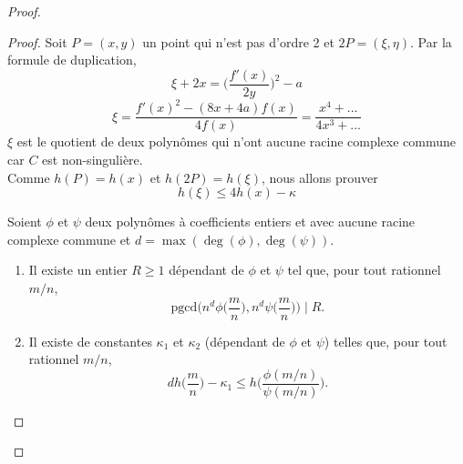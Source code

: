 \documentclass[a4paper]{article}
\begin{document}
\begin{proof}
\begin{proof}
Soit $P=(x,y)$ un point qui n'est pas d'ordre 2 et $2P=(\xi,\eta)$.
Par la formule de duplication, 
\begin{equation*}
\xi +2x=\Big( \frac{f'(x)}{2y}\Big)^2-a
\end{equation*}
\begin{equation*}
\xi=\frac{f'(x)^2-(8x+4a)f(x)}{4f(x)}=\frac{x^4+...}{4x^3+...}
\end{equation*}
$\xi$ est le quotient de deux polynômes qui n'ont aucune racine complexe commune car $C$ est non-singulière. \\
Comme $h(P)=h(x)$ et $h(2P)=h(\xi)$, nous allons prouver 
\begin{equation*}
h(\xi) \leqslant 4h(x)-\kappa
\end{equation*}


\begin{slem}\label{slem1}
Soient $\phi$ et $\psi$ deux polynômes à coefficients entiers et avec aucune racine complexe commune et $d=\max(\deg(\phi),\deg(\psi))$.
\begin{enumerate}[label=\roman*)]
\item Il existe un entier $R \geqslant 1$ dépendant de $\phi$ et $\psi$ tel que, pour tout rationnel $m/n$,
\begin{equation*}
\text{pgcd}\Big(n^d\phi\Big(\frac{m}{n}\Big),n^d\psi\Big(\frac{m}{n}\Big)\Big) \mid R.
\end{equation*}
\item Il existe de constantes $\kappa_{1}$ et $\kappa_{2}$ (dépendant de $\phi$ et $\psi$) telles que, pour tout rationnel $m/n$,
\begin{equation*}
dh\Big(\frac{m}{n}\Big)-\kappa_{1} \leqslant h\Big(\frac{\phi(m/n)}{\psi(m/n)}\Big). 
\end{equation*}
\end{enumerate}
\end{slem}



\end{proof}
\end{proof}
\end{document}

